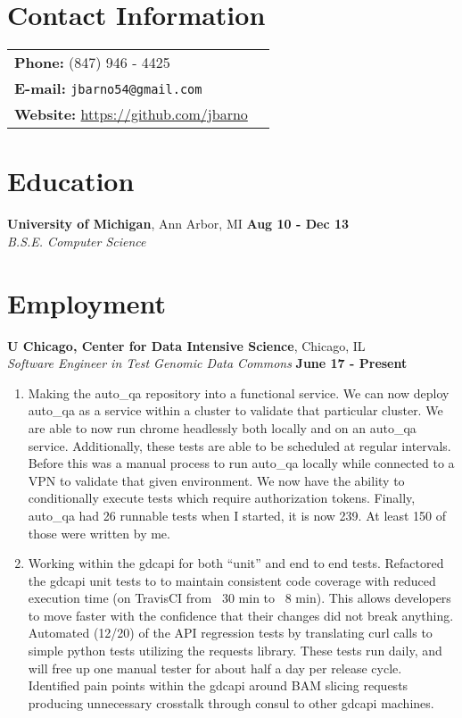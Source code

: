\documentclass[margin,line]{res}
\begin{document}
\address{ 5467 S Ingleside Ave}
\address{ APT 3W, Chicago IL} 

\begin{resume}

\section{\sc Contact Information}
\begin{tabular}{@{}p{3in}p{4in}}
{\bf Phone:  } (847) 946 - 4425\\
{\bf E-mail: } {\tt jbarno54@gmail.com} \\
{\bf Website:} \url{https://github.com/jbarno} \\
\end{tabular}


\section{\sc Education}
  {\bf University of Michigan}, Ann Arbor, MI \hfill {\bf Aug 10 - Dec 13}\\
  {\em B.S.E. Computer Science}


\section{\sc Employment}
  {\bf U Chicago, Center for Data Intensive Science}, Chicago, IL\\
  {\em Software Engineer in Test Genomic Data Commons} \hfill {\bf June 17 - Present}

\begin{enumerate}
  \item Making the auto\_qa repository into a functional service. We can now deploy auto\_qa as a service within
a cluster to validate that particular cluster. We are able to now run chrome headlessly both locally and on
an auto\_qa service. Additionally, these tests are able to be scheduled at regular intervals. Before this was
a manual process to run auto\_qa locally while connected to a VPN to validate that given environment. We
now have the ability to conditionally execute tests which require authorization tokens. Finally, auto\_qa had
26 runnable tests when I started, it is now 239. At least 150 of those were written by me.
  \item Working within the gdcapi for both “unit” and end to end tests. Refactored the gdcapi unit tests to to
maintain consistent code coverage with reduced execution time (on TravisCI from ~30 min to ~8 min).
This allows developers to move faster with the confidence that their changes did not break anything.
Automated (12/20) of the API regression tests by translating curl calls to simple
python tests utilizing the requests library. These tests run daily, and will free up one manual tester for
about half a day per release cycle. Identified pain points within the gdcapi around BAM slicing requests
producing unnecessary crosstalk through consul to other gdcapi machines.
\end{enumerate}


\end{resume}
\end{document}
